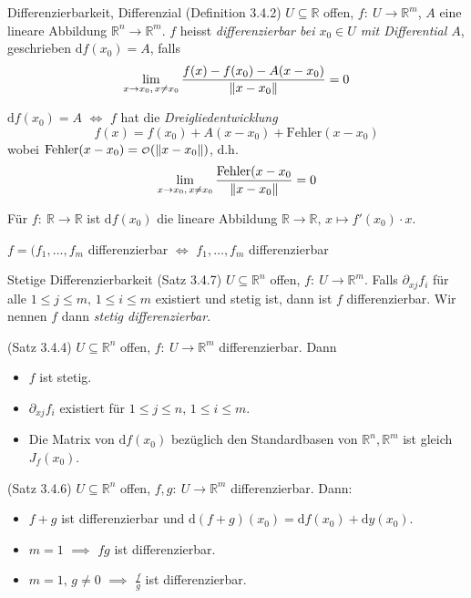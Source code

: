 \documentclass[a4paper,10pt]{article}
\def\R{\mathbb{R}}
\def\smallCalO{\begin{smallmatrix}\!\mathcal{O}\!\end{smallmatrix}}  %
\DeclarePairedDelimiter\norm{\lVert}{\rVert}
\begin{document}
\begin{mainbox}{Differenzierbarkeit, Differenzial (Definition 3.4.2)}
    \( U \subseteq \R \) offen, \( f: \: U \to \R^m \), \( A \) eine lineare Abbildung \( \R^n \to \R^m \). \( f \) heisst \emph{differenzierbar bei \( x_0 \in U \) mit Differential \( A \)}, geschrieben \( \mathrm{d} f(x_0) = A \), falls
    \[ \lim_{x \to x_0, \, x \neq x_0} \frac{f(x) - f(x_0) - A (x - x_0)}{\norm{x - x_0}} = 0 \]
\end{mainbox}

\( \mathrm{d} f(x_0) = A \) \( \iff \) \( f \) hat die \emph{Dreigliedentwicklung}
\[ f(x) = f(x_0) + A(x - x_0) + \text{Fehler}(x - x_0) \]
wobei \( \text{Fehler}(x - x_0) = \smallCalO (\norm{x - x_0}) \), d.h.
\[ \lim_{x \to x_0, \, x \neq x_0} \frac{\text{Fehler}(x - x_0}{\norm{x - x_0}} = 0 \]

Für \( f: \: \R \to \R \) ist \( \mathrm{d} f(x_0) \) die lineare Abbildung \( \R \to \R, \, x \mapsto f'(x_0) \cdot x \).

\( f = (f_1, \dots, f_m \) differenzierbar \( \iff \) \( f_1, \dots, f_m \) differenzierbar

\begin{subbox}{Stetige Differenzierbarkeit (Satz 3.4.7)}
    \( U \subseteq \R^n \) offen, \(f: \: U \to \R^m \). Falls \( \partial_{xj} f_i \) für alle \( 1 \leq j \leq m, \, 1 \leq i \leq m \) existiert und stetig ist, dann ist \( f \) differenzierbar.
    Wir nennen \( f \) dann \emph{stetig differenzierbar}.
\end{subbox}

\begin{subbox}{(Satz 3.4.4)}
    \( U \subseteq \R^n \) offen, \( f: \: U \to \R^m \) differenzierbar. Dann
    \begin{itemize}
        \item \( f \) ist stetig.
        \item \( \partial_{xj} f_i \) existiert für \( 1 \leq j \leq n, \, 1 \leq i \leq m \).
        \item Die Matrix von \( \mathrm{d} f (x_0) \) bezüglich den Standardbasen von \( \R^n, \R^m \) ist gleich \( J_f(x_0) \).
    \end{itemize}
\end{subbox}

\begin{subbox}{(Satz 3.4.6)}
    \( U \subseteq \R^n \) offen, \(f, g: \: U \to \R^m \) differenzierbar. Dann:
    \begin{itemize}
        \item \( f + g \) ist differenzierbar und \( \mathrm{d} (f + g)(x_0) = \mathrm{d} f(x_0) + \mathrm{d} y(x_0) \).
        \item \( m = 1 \) \( \implies \) \( fg \) ist differenzierbar.
        \item \( m = 1, \, g \neq 0 \) \( \implies \) \( \frac{f}{g} \) ist differenzierbar.
    \end{itemize}
\end{subbox}
\end{document}
